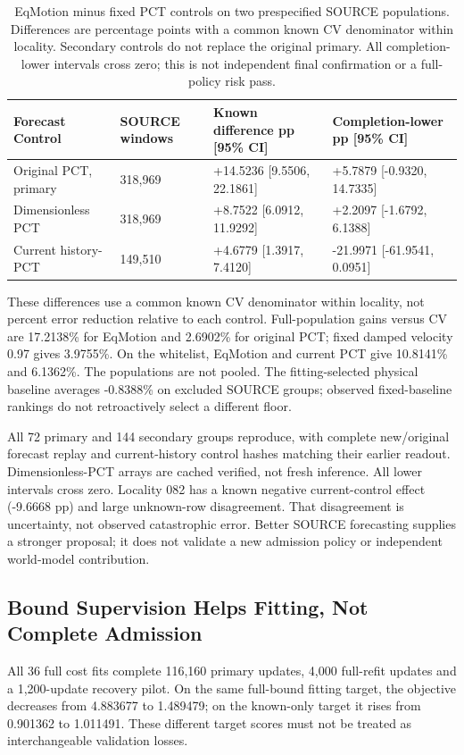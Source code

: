 \documentclass[10pt,twocolumn,letterpaper]{article}
\begin{document}
\begin{table}[!t]\centering\small
\begin{tabularx}{\textwidth}{@{}XXXX@{}}\toprule
Forecast Control & SOURCE windows & Known difference pp [95\% CI] & Completion-lower pp [95\% CI] \\
\midrule
Original PCT, primary & 318,969 & +14.5236 [9.5506, 22.1861] & +5.7879 [-0.9320, 14.7335] \\
Dimensionless PCT & 318,969 & +8.7522 [6.0912, 11.9292] & +2.2097 [-1.6792, 6.1388] \\
Current history-PCT & 149,510 & +4.6779 [1.3917, 7.4120] & -21.9971 [-61.9541, 0.0951] \\
\bottomrule\end{tabularx}
\caption{EqMotion minus fixed PCT controls on two prespecified SOURCE populations. Differences are percentage points with a common known CV denominator within locality. Secondary controls do not replace the original primary. All completion-lower intervals cross zero; this is not independent final confirmation or a full-policy risk pass.}\end{table}
These differences use a common known CV denominator within locality, not
percent error reduction relative to each control. Full-population gains versus
CV are 17.2138\% for EqMotion and 2.6902\% for original PCT; fixed damped velocity
0.97 gives 3.9755\%. On the whitelist, EqMotion and current PCT give 10.8141\%
and 6.1362\%. The populations are not pooled. The fitting-selected physical
baseline averages -0.8388\% on excluded SOURCE groups; observed fixed-baseline
rankings do not retroactively select a different floor.

All 72 primary and 144 secondary groups reproduce, with complete new/original
forecast replay and current-history control hashes matching their earlier
readout. Dimensionless-PCT arrays are cached verified, not fresh inference.
All lower intervals cross zero. Locality 082 has a known negative current-control
effect (-9.6668 pp) and large unknown-row disagreement. That disagreement is
uncertainty, not observed catastrophic error. Better SOURCE forecasting supplies
a stronger proposal; it does not validate a new admission policy or independent
world-model contribution.

\subsection{Bound Supervision Helps Fitting, Not Complete Admission}
All 36 full cost fits complete 116,160 primary updates, 4,000 full-refit updates
and a 1,200-update recovery pilot. On the same full-bound fitting target, the
objective decreases from 4.883677 to 1.489479; on the known-only target it rises
from 0.901362 to 1.011491. These different target scores must not be treated as
interchangeable validation losses.
\end{document}
